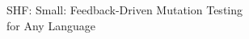 \documentclass[11pt]{article}
\begin{document}
\begin{center}
  \huge SHF: Small: Feedback-Driven Mutation Testing\\for Any Language
\end{center}













\newpage
\setcounter{page}{1}



\end{document}
